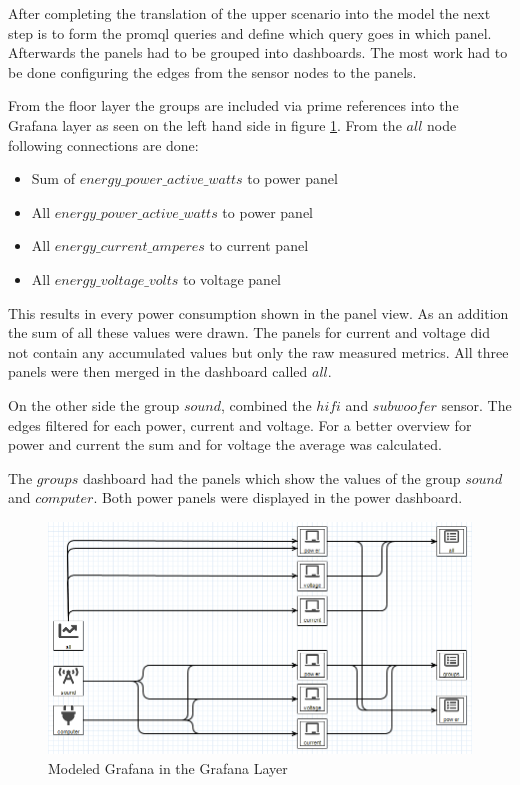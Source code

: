 After completing the translation of the upper scenario into the model the next step is to form the \gls{promql} queries and define which query goes in which panel. Afterwards the panels had to be grouped into dashboards. The most work had to be done configuring the edges from the sensor nodes to the panels.

From the floor layer the groups are included via prime references into the Grafana layer as seen on the left hand side in figure \ref{fig:modelGrafanaLayer}. From the $all$ node following connections are done:

\begin{itemize}
	\item Sum of $energy\_power\_active\_watts$ to power panel
	\item All $energy\_power\_active\_watts$ to power panel
	\item All $energy\_current\_amperes$ to current panel
 	\item All $energy\_voltage\_volts$ to voltage panel
\end{itemize}

This results in every power consumption shown in the panel view. As an addition the sum of all these values were drawn. The panels for current and voltage did not contain any accumulated values but only the raw measured metrics. All three panels were then merged in the dashboard called $all$.

On the other side the group $sound$, combined the $hifi$ and $subwoofer$ sensor. The edges filtered for each power, current and voltage. For a better overview for power and current the sum and for voltage the average was calculated. 

The $groups$ dashboard had the panels which show the values of the group $sound$ and $computer$. Both power panels were displayed in the power dashboard.

\begin{figure}[!ht]
	\centering 
	\includegraphics[width=\linewidth]{assets/images/grafanaLayer}
	\caption{Modeled Grafana in the Grafana Layer}
	\label{fig:modelGrafanaLayer}
\end{figure}

